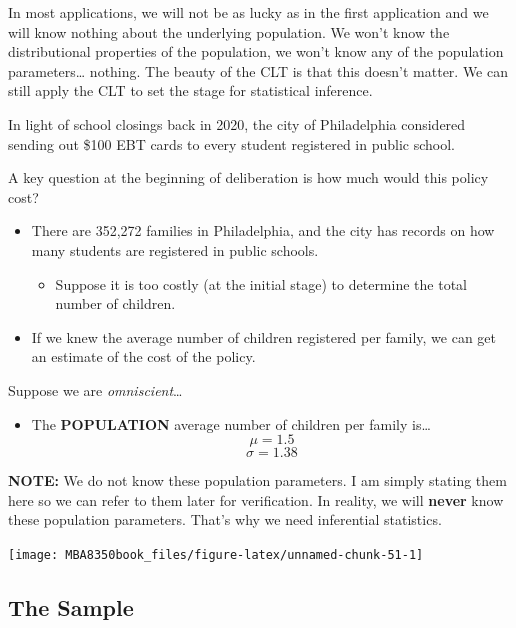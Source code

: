 \documentclass[
]{book}
\providecommand{\tightlist}{%
  \setlength{\itemsep}{0pt}\setlength{\parskip}{0pt}}
\begin{document}
In most applications, we will not be as lucky as in the first application and we will know nothing about the underlying population. We won't know the distributional properties of the population, we won't know any of the population parameters\ldots{} nothing. The beauty of the CLT is that this doesn't matter. We can still apply the CLT to set the stage for statistical inference.

In light of school closings back in 2020, the city of Philadelphia considered sending out \$100 EBT cards to every student registered in public school.

A key question at the beginning of deliberation is how much would this policy cost?

\begin{itemize}
\item
  There are 352,272 families in Philadelphia, and the city has records on how many students are registered in public schools.

  \begin{itemize}
  \tightlist
  \item
    Suppose it is too costly (at the initial stage) to determine the total number of children.
  \end{itemize}
\item
  If we knew the average number of children registered per family, we can get an estimate of the cost of the policy.
\end{itemize}

Suppose we are \emph{omniscient}\ldots{}

\begin{itemize}
\tightlist
\item
  The \textbf{POPULATION} average number of children per family is\ldots{}
  \[\mu = 1.5\]
  \[\sigma = 1.38\]
\end{itemize}

\textbf{NOTE:} We do not know these population parameters. I am simply stating them here so we can refer to them later for verification. In reality, we will \textbf{never} know these population parameters. That's why we need inferential statistics.

\begin{center}\texttt{[image: MBA8350book\_files/figure-latex/unnamed-chunk-51-1]} \end{center}

\hypertarget{the-sample}{%
\subsection{The Sample}\label{the-sample}}
\end{document}
